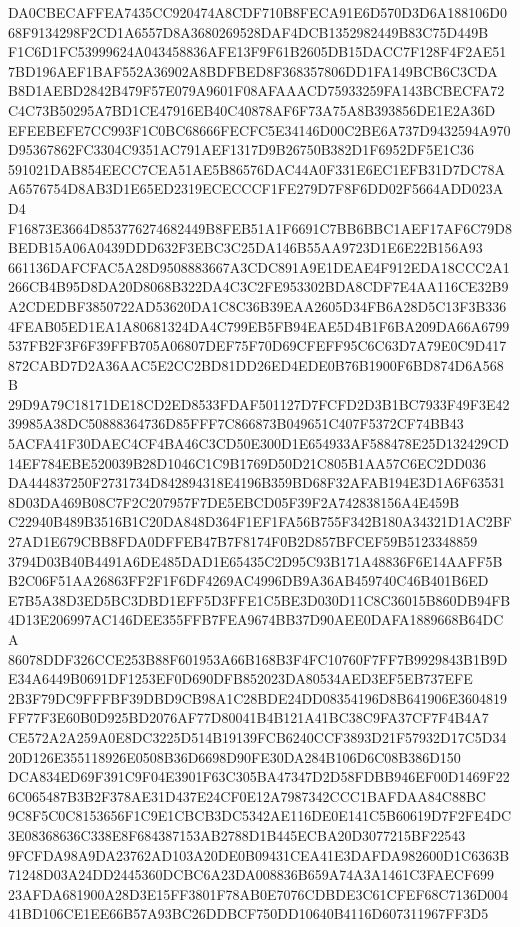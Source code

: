 \documentclass[UTF8,fontset=fandol,zihao=-4,a4paper]{ctexart}
\begin{document}
{{DA0CBECAFFEA7435CC920474A8CDF710B8FECA91E6D570D3D6A188106D068F9134298F2CD1A6557D8A3680269528DAF4DCB1352982449B83C75D449B
F1C6D1FC53999624A043458836AFE13F9F61B2605DB15DACC7F128F4F2AE517BD196AEF1BAF552A36902A8BDFBED8F368357806DD1FA149BCB6C3CDA
B8D1AEBD2842B479F57E079A9601F08AFAAACD75933259FA143BCBECFA72C4C73B50295A7BD1CE47916EB40C40878AF6F73A75A8B393856DE1E2A36D
EFEEBEFE7CC993F1C0BC68666FECFC5E34146D00C2BE6A737D9432594A970D95367862FC3304C9351AC791AEF1317D9B26750B382D1F6952DF5E1C36
591021DAB854EECC7CEA51AE5B86576DAC44A0F331E6EC1EFB31D7DC78AA6576754D8AB3D1E65ED2319ECECCCF1FE279D7F8F6DD02F5664ADD023AD4
F16873E3664D853776274682449B8FEB51A1F6691C7BB6BBC1AEF17AF6C79D8BEDB15A06A0439DDD632F3EBC3C25DA146B55AA9723D1E6E22B156A93
661136DAFCFAC5A28D9508883667A3CDC891A9E1DEAE4F912EDA18CCC2A1266CB4B95D8DA20D8068B322DA4C3C2FE953302BDA8CDF7E4AA116CE32B9
A2CDEDBF3850722AD53620DA1C8C36B39EAA2605D34FB6A28D5C13F3B3364FEAB05ED1EA1A80681324DA4C799EB5FB94EAE5D4B1F6BA209DA66A6799
537FB2F3F6F39FFB705A06807DEF75F70D69CFEFF95C6C63D7A79E0C9D417872CABD7D2A36AAC5E2CC2BD81DD26ED4EDE0B76B1900F6BD874D6A568B
29D9A79C18171DE18CD2ED8533FDAF501127D7FCFD2D3B1BC7933F49F3E4239985A38DC50888364736D85FFF7C866873B049651C407F5372CF74BB43
5ACFA41F30DAEC4CF4BA46C3CD50E300D1E654933AF588478E25D132429CD14EF784EBE520039B28D1046C1C9B1769D50D21C805B1AA57C6EC2DD036
DA444837250F2731734D842894318E4196B359BD68F32AFAB194E3D1A6F635318D03DA469B08C7F2C207957F7DE5EBCD05F39F2A742838156A4E459B
C22940B489B3516B1C20DA848D364F1EF1FA56B755F342B180A34321D1AC2BF27AD1E679CBB8FDA0DFFEB47B7F8174F0B2D857BFCEF59B5123348859
3794D03B40B4491A6DE485DAD1E65435C2D95C93B171A48836F6E14AAFF5BB2C06F51AA26863FF2F1F6DF4269AC4996DB9A36AB459740C46B401B6ED
E7B5A38D3ED5BC3DBD1EFF5D3FFE1C5BE3D030D11C8C36015B860DB94FB4D13E206997AC146DEE355FFB7FEA9674BB37D90AEE0DAFA1889668B64DCA
86078DDF326CCE253B88F601953A66B168B3F4FC10760F7FF7B9929843B1B9DE34A6449B0691DF1253EF0D690DFB852023DA80534AED3EF5EB737EFE
2B3F79DC9FFFBF39DBD9CB98A1C28BDE24DD08354196D8B641906E3604819FF77F3E60B0D925BD2076AF77D80041B4B121A41BC38C9FA37CF7F4B4A7
CE572A2A259A0E8DC3225D514B19139FCB6240CCF3893D21F57932D17C5D3420D126E355118926E0508B36D6698D90FE30DA284B106D6C08B386D150
DCA834ED69F391C9F04E3901F63C305BA47347D2D58FDBB946EF00D1469F226C065487B3B2F378AE31D437E24CF0E12A7987342CCC1BAFDAA84C88BC
9C8F5C0C8153656F1C9E1CBCB3DC5342AE116DE0E141C5B60619D7F2FE4DC3E08368636C338E8F684387153AB2788D1B445ECBA20D3077215BF22543
9FCFDA98A9DA23762AD103A20DE0B09431CEA41E3DAFDA982600D1C6363B71248D03A24DD2445360DCBC6A23DA008836B659A74A3A1461C3FAECF699
23AFDA681900A28D3E15FF3801F78AB0E7076CDBDE3C61CFEF68C7136D00441BD106CE1EE66B57A93BC26DDBCF750DD10640B4116D607311967FF3D5
}}
\end{document}
